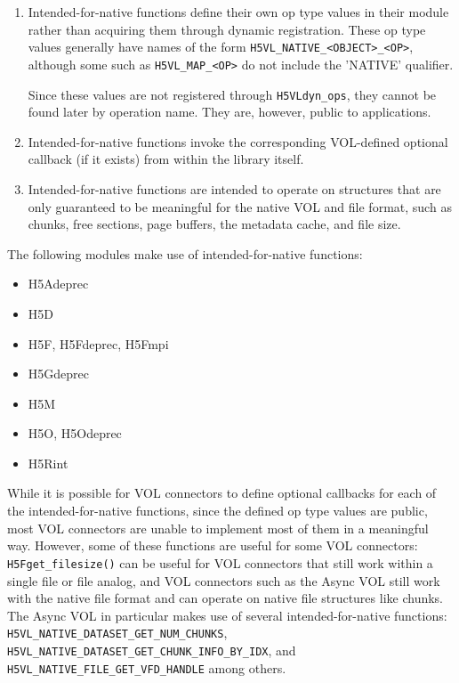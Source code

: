 \begin{enumerate}
    \item Intended-for-native functions define their own op type values in their module rather than acquiring them through dynamic registration. These op type values generally have names of the form \texttt{H5VL\_NATIVE\_<OBJECT>\_<OP>}, although some such as \texttt{H5VL\_MAP\_<OP>} do not include the 'NATIVE' qualifier.

    Since these values are not registered through \texttt{H5VLdyn\_ops}, they cannot be found later by operation name. They are, however, public to applications.

    \item Intended-for-native functions invoke the corresponding VOL-defined optional callback (if it exists) from within the library itself.

    \item Intended-for-native functions are intended to operate on structures that are only guaranteed to be meaningful for the native VOL and file format, such as chunks, free sections, page buffers, the metadata cache, and file size.
\end{enumerate}

The following modules make use of intended-for-native functions:

\begin{itemize}
    \item H5Adeprec
    \item H5D
    \item H5F, H5Fdeprec, H5Fmpi
    \item H5Gdeprec
    \item H5M
    \item H5O, H5Odeprec
    \item H5Rint
\end{itemize}

While it is possible for VOL connectors to define optional callbacks for each of the intended-for-native functions, since the defined op type values are public, most VOL connectors are unable to implement most of them in a meaningful way. However, some of these functions are useful for some VOL connectors: \texttt{H5Fget\_filesize()} can be useful for VOL connectors that still work within a single file or file analog, and VOL connectors such as the Async VOL still work with the native file format and can operate on native file structures like chunks. The Async VOL in particular makes use of several intended-for-native functions: \texttt{H5VL\_NATIVE\_DATASET\_GET\_NUM\_CHUNKS}, \texttt{H5VL\_NATIVE\_DATASET\_GET\_CHUNK\_INFO\_BY\_IDX}, and \texttt{H5VL\_NATIVE\_FILE\_GET\_VFD\_HANDLE} among others.

